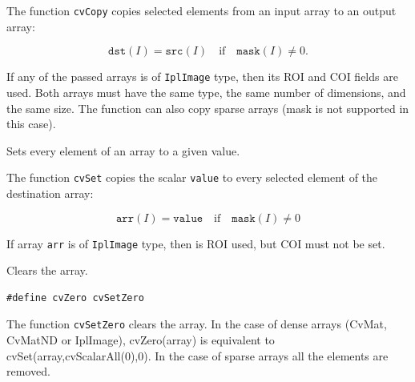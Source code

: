 The function \texttt{cvCopy} copies selected elements from an input array to an output array:

\[
\texttt{dst}(I)=\texttt{src}(I) \quad \text{if} \quad \texttt{mask}(I) \ne 0.
\]

If any of the passed arrays is of \texttt{IplImage} type, then its ROI
and COI fields are used. Both arrays must have the same type, the same
number of dimensions, and the same size. The function can also copy sparse
arrays (mask is not supported in this case).

\label{Set}

Sets every element of an array to a given value.


\begin{description}
\end{description}


The function \texttt{cvSet} copies the scalar \texttt{value} to every selected element of the destination array:

\[
\texttt{arr}(I)=\texttt{value} \quad \text{if} \quad \texttt{mask}(I) \ne 0
\]

If array \texttt{arr} is of \texttt{IplImage} type, then is ROI used, but COI must not be set.

\label{SetZero}

Clears the array.


\begin{lstlisting}
#define cvZero cvSetZero
\end{lstlisting}

\begin{description}
\end{description}

The function \texttt{cvSetZero} clears the array. In the case of dense arrays (CvMat, CvMatND or IplImage), cvZero(array) is equivalent to
cvSet(array,cvScalarAll(0),0).
In the case of sparse arrays all the elements are removed.


